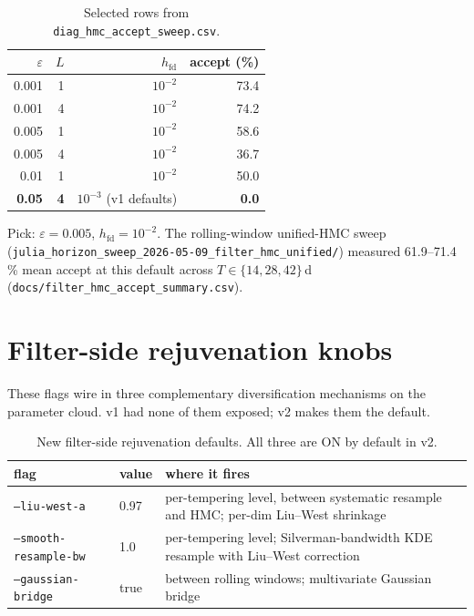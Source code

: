 \documentclass[11pt,a4paper]{article}
\begin{document}
\begin{table}[ht]
\centering
\small
\begin{tabular}{rrrr}
\toprule
$\varepsilon$ & $L$ & $h_{\mathrm{fd}}$ & accept (\%) \\
\midrule
0.001  & 1 & $10^{-2}$ & 73.4 \\
0.001  & 4 & $10^{-2}$ & 74.2 \\
0.005  & 1 & $10^{-2}$ & 58.6 \\
0.005  & 4 & $10^{-2}$ & 36.7 \\
0.01   & 1 & $10^{-2}$ & 50.0 \\
\textbf{0.05} & \textbf{4} & \textbf{$10^{-3}$} (v1 defaults) & \textbf{0.0} \\
\bottomrule
\end{tabular}
\caption{Selected rows from \texttt{diag\_hmc\_accept\_sweep.csv}.}
\label{tab:hmc_sweep}
\end{table}

\noindent
Pick: $\varepsilon = 0.005$, $h_{\mathrm{fd}} = 10^{-2}$. The
rolling-window unified-HMC sweep
(\texttt{julia\_horizon\_sweep\_2026-05-09\_filter\_hmc\_unified/})
measured 61.9--71.4\,\% mean accept at this default across
$T \in \{14, 28, 42\}$\,d
(\texttt{docs/filter\_hmc\_accept\_summary.csv}).


\section{Filter-side rejuvenation knobs}
\label{sec:rejuv}

These flags wire in three complementary diversification mechanisms
on the parameter cloud. v1 had none of them exposed; v2 makes them
the default.

\begin{table}[ht]
\centering
\small
\begin{tabular}{lll}
\toprule
flag & value & where it fires \\
\midrule
\texttt{--liu-west-a}        & 0.97 & per-tempering level, between systematic resample and HMC; per-dim Liu--West shrinkage \\
\texttt{--smooth-resample-bw} & 1.0  & per-tempering level; Silverman-bandwidth KDE resample with Liu--West correction \\
\texttt{--gaussian-bridge}   & true & between rolling windows; multivariate Gaussian bridge \\
\bottomrule
\end{tabular}
\caption{New filter-side rejuvenation defaults. All three are ON by
default in v2.}
\label{tab:rejuv}
\end{table}
\end{document}
